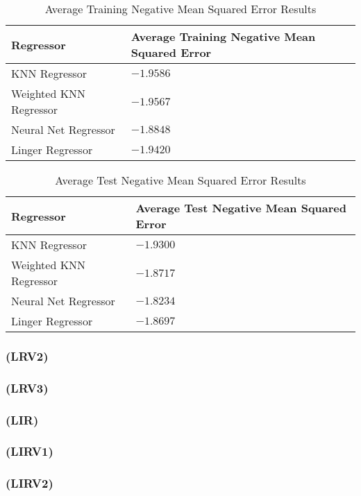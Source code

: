 \documentclass[a4paper, 12pt]{report}
\begin{document}
\begin{table}[H]
    \centering
    \caption{Average Training Negative Mean Squared Error Results}
    \label{tab:average_results_train_LRV1_Abalone}
    \begin{tabular}{|l|l|}
    \hline
    \textbf{Regressor} & \textbf{Average Training Negative Mean Squared Error} \\ \hline
    KNN Regressor &  $-1.9586$\\ \hline
    Weighted KNN Regressor &  $-1.9567$\\ \hline
    Neural Net Regressor & $-1.8848$\\ \hline
    Linger Regressor & $-1.9420$\\ \hline
    \end{tabular}
\end{table}

\begin{table}[H]
    \centering
    \caption{Average Test Negative Mean Squared Error Results}
    \label{tab:average_results_test_LRV1_Abalone}
    \begin{tabular}{|l|l|}
    \hline
    \textbf{Regressor} & \textbf{Average Test Negative Mean Squared Error} \\ \hline
    KNN Regressor & $-1.9300$ \\ \hline
    Weighted KNN Regressor & $-1.8717$ \\ \hline
    Neural Net Regressor & $-1.8234$ \\ \hline
    Linger Regressor & $-1.8697$ \\ \hline
    \end{tabular}
\end{table}

\subsubsection{(LRV2)}
\subsubsection{(LRV3)}
\subsubsection{(LIR)}
\subsubsection{(LIRV1)}
\subsubsection{(LIRV2)}
\end{document}
